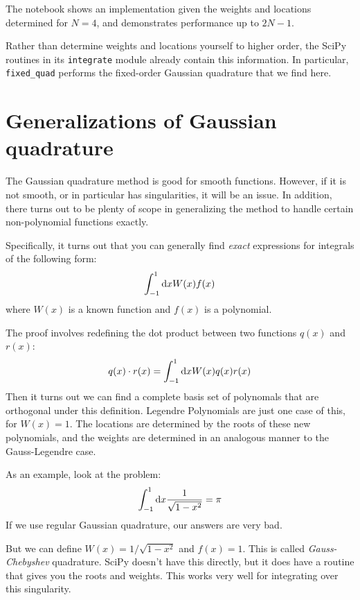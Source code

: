 The notebook shows an implementation given the weights and locations
determined for $N=4$, and demonstrates performance up to $2N-1$.

Rather than determine weights and locations yourself to higher order,
the SciPy routines in its {\tt integrate} module already contain this
information. In particular, {\tt fixed\_quad} performs the fixed-order
Gaussian quadrature that we find here.

\section{Generalizations of Gaussian quadrature}

The Gaussian quadrature method is good for smooth functions. However,
if it is not smooth, or in particular has singularities, it will be an
issue. In addition, there turns out to be plenty of scope in
generalizing the method to handle certain non-polynomial functions
exactly.

Specifically, it turns out that you can generally find {\it exact}
expressions for integrals of the following form:
\begin{equation}
\int_{-1}^{1} {\rm d}x W(x) f(x) 
\end{equation}
where $W(x)$ is a known function and $f(x)$ is a polynomial. 

The proof involves redefining the dot product between two functions
$q(x)$ and $r(x)$:
\begin{equation}
  q(x) \cdot r(x) = \int_{-1}^{1} {\rm d}x W(x) q(x) r(x)
\end{equation}
Then it turns out we can find a complete basis set of polynomals that
are orthogonal under this definition. Legendre Polynomials are just
one case of this, for $W(x)=1$. The locations are determined by the
roots of these new polynomials, and the weights are determined in an
analogous manner to the Gauss-Legendre case.

As an example, look at the problem:
\begin{equation}
\int_{-1}^{1} {\rm d}x \frac{1}{\sqrt{1-x^2}} = \pi
\end{equation}
If we use regular Gaussian quadrature, our answers are very bad.

But we can define $W(x)=1/\sqrt{1-x^2}$ and $f(x)=1$. This is called
{\it Gauss-Chebyshev} quadrature. SciPy doesn't have this directly,
but it does have a routine that gives you the roots and weights.  This
works very well for integrating over this singularity.

